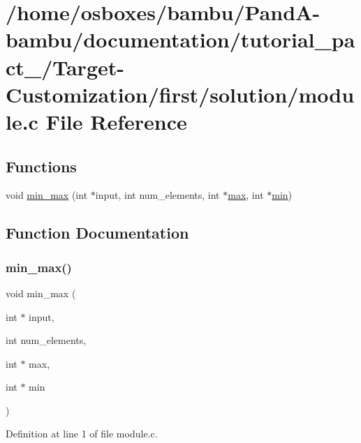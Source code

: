 \hypertarget{tutorial__pact__2019_2Target-Customization_2first_2solution_2module_8c}{}\section{/home/osboxes/bambu/\+Pand\+A-\/bambu/documentation/tutorial\+\_\+pact\+\_/\+Target-\/\+Customization/first/solution/module.c File Reference}
\label{tutorial__pact__2019_2Target-Customization_2first_2solution_2module_8c}
\subsection*{Functions}
\begin{DoxyCompactItemize}
\item 
void \hyperlink{tutorial__pact__2019_2Target-Customization_2first_2solution_2module_8c_ac07ce44426a0d2fb3786ace2dc125567}{min\+\_\+max} (int $\ast$input, int num\+\_\+elements, int $\ast$\hyperlink{tutorial__pact__2019_2Target-Customization_2first_2hint_8c_a28f422940797ea297699ba55d89171c5}{max}, int $\ast$\hyperlink{tutorial__pact__2019_2Introduction_2sixth_2qsort_8c_abb702d8b501669a23aa0ab3b281b9384}{min})
\end{DoxyCompactItemize}


\subsection{Function Documentation}
\mbox{\label{tutorial__pact__2019_2Target-Customization_2first_2solution_2module_8c_ac07ce44426a0d2fb3786ace2dc125567}} 
\subsubsection{\texorpdfstring{min\+\_\+max()}{min\_max()}}
{\footnotesize\ttfamily void min\+\_\+max (\begin{DoxyParamCaption}\item[{int $\ast$}]{input,  }\item[{int}]{num\+\_\+elements,  }\item[{int $\ast$}]{max,  }\item[{int $\ast$}]{min }\end{DoxyParamCaption})}



Definition at line 1 of file module.\+c.

